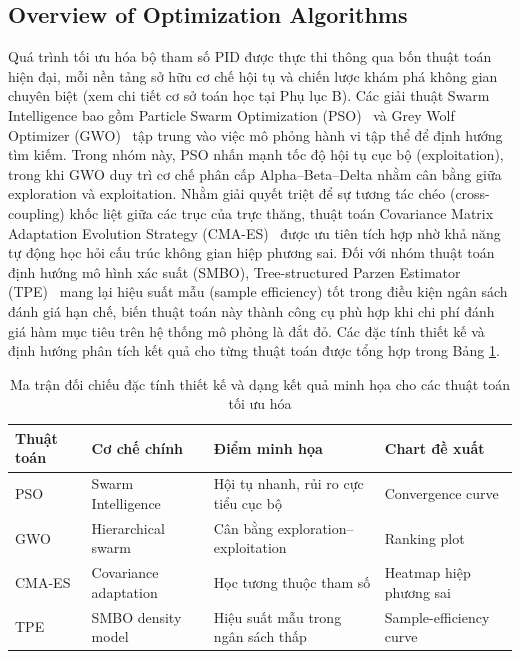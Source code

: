 \documentclass[conference, a4paper]{IEEEtran}
\begin{document}
\subsection{Overview of Optimization Algorithms}
Quá trình tối ưu hóa bộ tham số PID được thực thi thông qua bốn thuật toán hiện đại, mỗi nền tảng sở hữu cơ chế hội tụ và chiến lược khám phá không gian chuyên biệt (xem chi tiết cơ sở toán học tại Phụ lục B). Các giải thuật Swarm Intelligence bao gồm Particle Swarm Optimization (PSO)~\cite{b3} và Grey Wolf Optimizer (GWO)~\cite{mirjalili2014grey} tập trung vào việc mô phỏng hành vi tập thể để định hướng tìm kiếm. Trong nhóm này, PSO nhấn mạnh tốc độ hội tụ cục bộ (exploitation), trong khi GWO duy trì cơ chế phân cấp Alpha--Beta--Delta nhằm cân bằng giữa exploration và exploitation. Nhằm giải quyết triệt để sự tương tác chéo (cross-coupling) khốc liệt giữa các trục của trực thăng, thuật toán Covariance Matrix Adaptation Evolution Strategy (CMA-ES)~\cite{hansen2001completely} được ưu tiên tích hợp nhờ khả năng tự động học hỏi cấu trúc không gian hiệp phương sai. Đối với nhóm thuật toán định hướng mô hình xác suất (SMBO), Tree-structured Parzen Estimator (TPE)~\cite{bergstra2011algorithms} mang lại hiệu suất mẫu (sample efficiency) tốt trong điều kiện ngân sách đánh giá hạn chế, biến thuật toán này thành công cụ phù hợp khi chi phí đánh giá hàm mục tiêu trên hệ thống mô phỏng là đắt đỏ. Các đặc tính thiết kế và định hướng phân tích kết quả cho từng thuật toán được tổng hợp trong Bảng \ref{tab:optimizer-design-matrix}.

\begin{table}[!t]
\caption{Ma trận đối chiếu đặc tính thiết kế và dạng kết quả minh họa cho các thuật toán tối ưu hóa}
\label{tab:optimizer-design-matrix}
\centering
\small
\begin{tabular}{>{\raggedright\arraybackslash}p{}>{\raggedright\arraybackslash}p{}>{\raggedright\arraybackslash}p{}>{\raggedright\arraybackslash}p{}}
\toprule
Thuật toán & Cơ chế chính & Điểm minh họa & Chart đề xuất \\
\midrule
PSO~\cite{b3} & Swarm Intelligence & Hội tụ nhanh, rủi ro cực tiểu cục bộ & Convergence curve \\
GWO~\cite{mirjalili2014grey} & Hierarchical swarm & Cân bằng exploration--exploitation & Ranking plot \\
CMA-ES~\cite{hansen2001completely} & Covariance adaptation & Học tương thuộc tham số & Heatmap hiệp phương sai \\
TPE~\cite{bergstra2011algorithms} & SMBO density model & Hiệu suất mẫu trong ngân sách thấp & Sample-efficiency curve \\
\bottomrule
\end{tabular}
\end{table}
\end{document}
